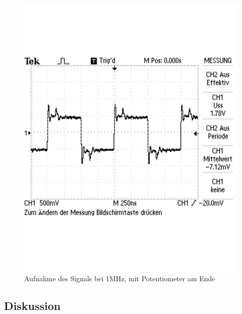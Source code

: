 \documentclass[12pt,a4paper]{article}
\begin{document}
\begin{figure}[H] 
  \centering
    \includegraphics[trim = 0cm 6cm 0cm 0cm,clip , scale = 0.5]{3_5.pdf}
  	\caption[Aufnahme des Signals bei 1MHz, mit Potentiometer am Ende]{Aufnahme des Signals bei 1MHz, mit Potentiometer am Ende}
  \label{fig:3_5}
\end{figure}

\subsection{Diskussion}
\end{document}
